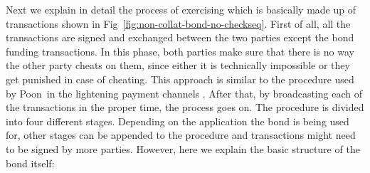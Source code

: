 
Next\newfateme{,} we explain in detail the process of exercising  which is basically made up of transactions shown in Fig~\ref{fig:non-collat-bond-no-checkseq}. First of all, all the transactions are signed and exchanged between the two parties except the bond funding transactions. In this phase, both parties make sure that there is no way the other party cheats on them, since either it is technically impossible or they get punished in case of cheating. This approach is similar to the procedure used by Poon~\etal in the lightening payment channels . After that, by broadcasting each of the transactions in the proper time, the process goes on. The procedure is divided into four different stages. Depending on the application the bond is being used for, other stages can be appended to the procedure and transactions might need to be signed by more parties. However, here we explain the basic structure of the bond itself: 
